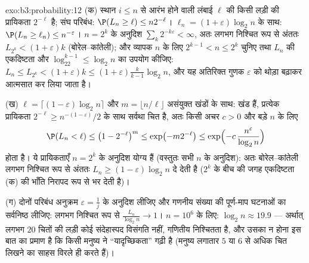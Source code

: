 \begin{solution}{exo:b3:probability:12}
(क) स्थान $i \leq n$ से आरंभ होने वाली लंबाई $\ell$ की किसी
लड़ी की प्रायिकता $2^{-\ell}$ है; संघ परिबंध: $\P(L_n \geq
\ell) \leq n2^{-\ell}$। $\ell_n = (1 +
\varepsilon)\log_2n$ के साथ: $\P(L_n \geq \ell_n) \leq
n^{-\varepsilon}$। $n = 2^k$ के अनुदिश
$\sum_k2^{-k\varepsilon} < \infty$, अतः लगभग निश्चित रूप से
अंततः $L_{2^k} < (1+\varepsilon)k$ (बोरेल--कांतेली); और
व्यापक $n$ के लिए $2^{k-1} < n \leq 2^k$ चुनिए तथा $L_n$ की
एकदिष्टता और $\log_22^{k-1} \leq \log_2n$ का उपयोग कीजिए:
$L_n \leq L_{2^k}
< (1 + \varepsilon)k \leq (1 + \varepsilon)\frac{k}{k-1}
\log_2n$, और यह अतिरिक्त गुणक $\varepsilon$ को थोड़ा बढ़ाकर
आत्मसात कर लिया जाता है।

(ख) $\ell = \lceil(1 - \varepsilon)\log_2n\rceil$ और
$m = \lfloor n/\ell\rfloor$ असंयुक्त खंडों के साथ: खंड
 हैं, प्रत्येक प्रायिकता $2^{-\ell}
\geq n^{-(1-\varepsilon)}/2$ के साथ सर्वथा चित है, अतः किसी
अचर $c > 0$ और बड़े $n$ के लिए
\[
\P(L_n < \ell) \leq \bigl(1 - 2^{-\ell}\bigr)^{m}
\leq \exp\bigl(-m2^{-\ell}\bigr)
\leq \exp\Bigl(-c\,\frac{n^{\varepsilon}}{\log_2n}\Bigr)
\]
होता है। ये प्रायिकताएँ $n = 2^k$ के अनुदिश योग्य हैं
(वस्तुतः सभी $n$ के अनुदिश): अतः बोरेल--कांतेली लगभग निश्चित
रूप से अंततः $L_n \geq (1 -
\varepsilon)\log_2n$ दे देती है ($2^k$ के बीच की जगह
एकदिष्टता (क) की भाँति निरापद रूप से भर देती है)।

(ग) दोनों परिबंध अनुक्रम $\varepsilon = \frac1j$ के अनुदिश
लीजिए और गणनीय संख्या की पूर्ण-माप घटनाओं का सर्वनिष्ठ
लीजिए: लगभग निश्चित रूप से $\frac{L_n}{\log_2n} \to 1$। $n =
10^6$ के लिए: $\log_2n
\approx 19.9$ --- अर्थात् लगभग $20$ चितों की लड़ी कोई
संदेहास्पद विसंगति नहीं, गणितीय निश्चितता है, और उसका न होना
इस बात का प्रमाण है कि किसी मनुष्य ने ``यादृच्छिकता'' गढ़ी
है (मनुष्य लगातार $5$ या $6$ से अधिक चित लिखने का साहस
विरले ही करते हैं)।
\end{solution}

